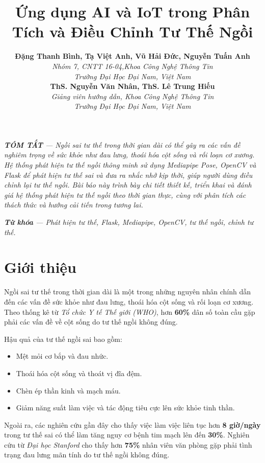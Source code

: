 \documentclass[journal,onecolumn]{IEEEtran}
\title{Ứng dụng AI và IoT trong Phân Tích và Điều Chỉnh Tư Thế Ngồi}
\author{
    \textbf{Đặng Thanh Bình, Tạ Việt Anh, Vũ Hải Đức, Nguyễn Tuấn Anh} \\
    \textit{Nhóm 7, CNTT 16-04,Khoa Công Nghệ Thông Tin} \\
    \textit{Trường Đại Học Đại Nam, Việt Nam} \\
    \textbf{ThS. Nguyễn Văn Nhân, ThS. Lê Trung Hiếu} \\
    \textit{Giảng viên hướng dẫn, Khoa Công Nghệ Thông Tin} \\
    \textit{Trường Đại Học Đại Nam, Việt Nam}
}
\begin{document}
\maketitle

\noindent\textit{\textbf{TÓM TẮT} --- Ngồi sai tư thế trong thời gian dài có thể gây ra các vấn đề nghiêm trọng về sức khỏe như đau lưng, thoái hóa cột sống và rối loạn cơ xương. Hệ thống phát hiện tư thế ngồi thông minh sử dụng Mediapipe Pose, OpenCV và Flask để phát hiện tư thế sai và đưa ra nhắc nhở kịp thời, giúp người dùng điều chỉnh lại tư thế ngồi. Bài báo này trình bày chi tiết thiết kế, triển khai và đánh giá hệ thống phát hiện tư thế ngồi theo thời gian thực, cùng với phân tích các thách thức và hướng cải tiến trong tương lai.}

\vspace{2mm} %

\noindent\textit{\textbf{Từ khóa} --- Phát hiện tư thế, Flask, Mediapipe, OpenCV, tư thế ngồi, chỉnh tư thế.}


\section{\textbf{Giới thiệu}}
Ngồi sai tư thế trong thời gian dài là một trong những nguyên nhân chính dẫn đến các vấn đề sức khỏe như đau lưng, thoái hóa cột sống và rối loạn cơ xương. Theo thống kê từ \textit{Tổ chức Y tế Thế giới (WHO)}, hơn \textbf{60\%} dân số toàn cầu gặp phải các vấn đề về cột sống do tư thế ngồi không đúng.  

Hậu quả của tư thế ngồi sai bao gồm:
\begin{itemize}
    \item Mệt mỏi cơ bắp và đau nhức.
    \item Thoái hóa cột sống và thoát vị đĩa đệm.
    \item Chèn ép thần kinh và mạch máu.
    \item Giảm năng suất làm việc và tác động tiêu cực lên sức khỏe tinh thần.
\end{itemize}

Ngoài ra, các nghiên cứu gần đây cho thấy việc làm việc liên tục hơn \textbf{8 giờ/ngày} trong tư thế sai có thể làm tăng nguy cơ bệnh tim mạch lên đến \textbf{30\%}. Nghiên cứu từ \textit{Đại học Stanford} cho thấy hơn \textbf{75\%} nhân viên văn phòng gặp phải tình trạng đau lưng mãn tính do tư thế ngồi không đúng.
\end{document}
